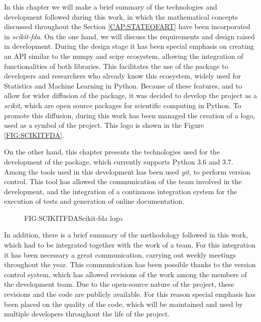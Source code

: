 
In this chapter we will make a brief summary of the technologies and development
followed during this work, in which the mathematical concepts discussed
throughout the Section \ref{CAP:STATEOFART} have been incorporated in
\textit{scikit-fda}. On the one hand, we will discuss the requirements and
design raised in development. During the design stage it has been special
emphasis on creating an \acs{API} similar to the numpy and scipy ecosystem, allowing
the integration of functionalities of both libraries. This facilitates the use
of the package to developers and researchers who already know this ecosystem,
widely used for Statistics and Machine Learning in Python. Because of these
features, and to allow for wider diffusion of the package, it was decided to
develop the project as a \textit{scikit}, which are open source packages for
scientific computing in Python.
To promote this diffusion, during this work has been managed the creation of a
logo, used as a symbol of the project. This logo is shown in the Figure
\ref{FIG:SCIKITFDA}.

On the other hand, this chapter presents the technologies used for the development of
the package, which currently supports Python 3.6 and 3.7.
Among the tools used in this development has been used \textit{git},
to perform version control. This tool has allowed the communication of the team
involved in the development, and the integration of a continuous integration
system for the execution of tests and generation of online documentation.

\begin{figure}[Scikit-fda logo]{FIG:SCIKITFDA}{Scikit-fda logo}
\end{figure}

In addition, there is a brief summary of the methodology followed in this work,
which had to be integrated together with the work of a team.
For this integration it has been necessary a great communication,
carrying out weekly meetings throughout the year. This communication has
been possible thanks to the version control system, which has allowed
revisions of the work among the members of the development team.
Due to the open-source nature of the project, these revisions and the code
are publicly available. For this reason special emphasis has been placed on
the quality of the code, which will be maintained and used by multiple
developers throughout the life of the project.
